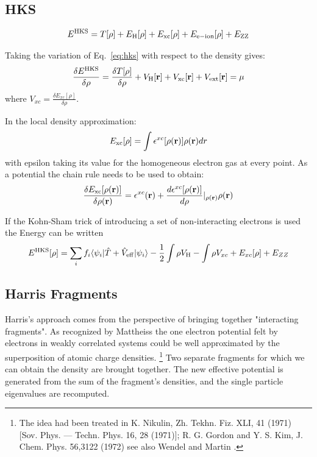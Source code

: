\subsection{HKS}
\begin{equation}
\label{eq:hks}
E^{\rm HKS} = T[\rho] + E_{\rm H}[\rho] + E_{\rm xc}[\rho] + E_{\rm e-ion}[\rho] + E_{\rm ZZ}
\end{equation}

Taking the variation of Eq.~\ref{eq:hks} with respect to the density gives:
%
\begin{equation}
\frac{\delta E^{\rm HKS}}{\delta \rho} = \frac{\delta T[\rho]}{\delta \rho} + V_{\rm H}[{\bf r}] + V_{\rm xc}[{\bf r}] + V_{\rm ext}[{\bf r}] = \mu
\end{equation}
%
where $V_{xc} = \frac{\delta E_{xc}[\rho]}{\delta \rho}$.

In the local density approximation:
%
\begin{equation}
E_{\rm xc}[\rho] = \int\epsilon^{xc}[\rho({\bf r})]\rho({\bf r})dr
\end{equation}
%
with epsilon taking its value for the homogeneous electron gas at 
every point. As a potential the chain rule needs to be used to obtain:
%
\begin{equation}
\frac{\delta E_{\rm xc}[\rho({\bf r})]}{\delta \rho({\bf r})} = \epsilon^{xc}({\bf r}) + \frac{d \epsilon^{xc}[\rho({\bf r})]}{d\rho}|_{\rho({\bf r})}\rho({\bf r})
\end{equation}
%

If the Kohn-Sham trick of introducing a set of non-interacting electrons is used the Energy can be written
%
\begin{equation}
E^{\rm HKS}[\rho] = \sum_{i}f_{i}\langle \psi_{i}|\hat{T} + \hat{V}_{\rm eff}|\psi_{i}\rangle - \frac{1}{2}\int\rho V_{\rm H} - \int\rho V_{xc} + E_{xc}[\rho] + E_{ZZ}
\end{equation}

\subsection{Harris Fragments}
Harris's approach \cite{harris85} comes from the perspective of bringing together 
"interacting fragments". As recognized by Mattheiss the one electron potential
felt by electrons in weakly correlated systems could be well approximated
by the superposition of atomic charge densities. \cite{mattheis64, haydock79}
\footnote{The idea had been treated in K. Nikulin, Zh. Tekhn. Fiz. XLI, 41 (1971) 
[Sov. Phys. — Techn. Phys. 16, 28 (1971)]; R. G. Gordon and Y. S. Kim, J. Chem. Phys. 56,3122 (1972)
see also Wendel and Martin \cite{wenel79}.}
Two separate fragments for which we can obtain the density are brought together. 
The new effective potential is generated from the sum of the fragment's densities, 
and the single particle eigenvalues are recomputed.

